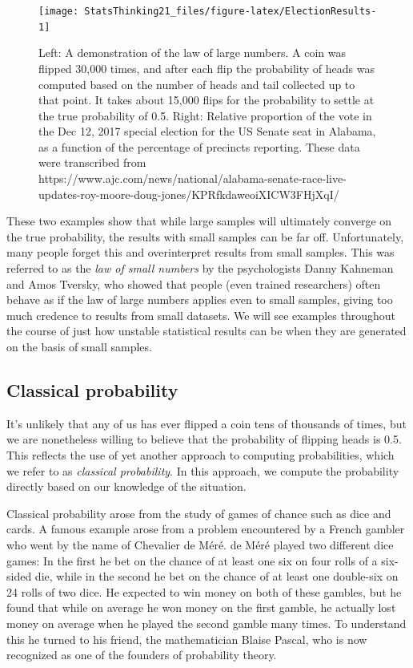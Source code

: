 \documentclass[12pt,]{book}
\theoremstyle{definition}
\theoremstyle{definition}
\theoremstyle{definition}
\theoremstyle{remark}
\begin{document}
\begin{figure}
\texttt{[image: StatsThinking21\_files/figure-latex/ElectionResults-1]} \caption{Left: A demonstration of the law of large numbers.  A coin was flipped 30,000 times, and after each flip the probability of heads was computed based on the number of heads and tail collected up to that point.  It takes about 15,000 flips for the probability to settle at the true probability of 0.5. Right: Relative proportion of the vote in the Dec 12, 2017 special election for the US Senate seat in Alabama, as a function of the percentage of precincts reporting. These data were transcribed from https://www.ajc.com/news/national/alabama-senate-race-live-updates-roy-moore-doug-jones/KPRfkdaweoiXICW3FHjXqI/}\label{fig:ElectionResults}
\end{figure}

These two examples show that while large samples will ultimately converge on the true probability, the results with small samples can be far off. Unfortunately, many people forget this and overinterpret results from small samples. This was referred to as the \emph{law of small numbers} by the psychologists Danny Kahneman and Amos Tversky, who showed that people (even trained researchers) often behave as if the law of large numbers applies even to small samples, giving too much credence to results from small datasets. We will see examples throughout the course of just how unstable statistical results can be when they are generated on the basis of small samples.

\hypertarget{classical-probability}{%
\subsection{Classical probability}\label{classical-probability}}

It's unlikely that any of us has ever flipped a coin tens of thousands of times, but we are nonetheless willing to believe that the probability of flipping heads is 0.5. This reflects the use of yet another approach to computing probabilities, which we refer to as \emph{classical probability}. In this approach, we compute the probability directly based on our knowledge of the situation.

Classical probability arose from the study of games of chance such as dice and cards. A famous example arose from a problem encountered by a French gambler who went by the name of Chevalier de Méré. de Méré played two different dice games: In the first he bet on the chance of at least one six on four rolls of a six-sided die, while in the second he bet on the chance of at least one double-six on 24 rolls of two dice. He expected to win money on both of these gambles, but he found that while on average he won money on the first gamble, he actually lost money on average when he played the second gamble many times. To understand this he turned to his friend, the mathematician Blaise Pascal, who is now recognized as one of the founders of probability theory.
\end{document}
